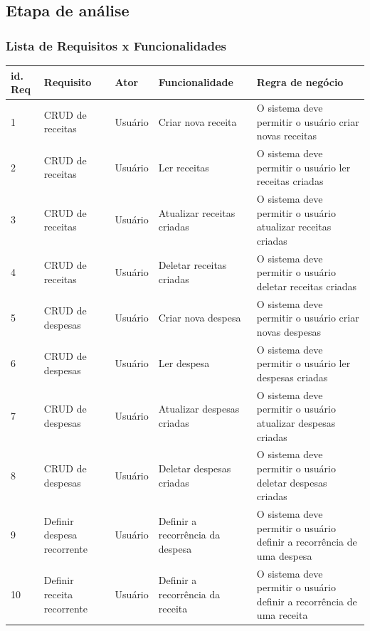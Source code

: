 \subsection{Etapa de análise}

\subsubsection{Lista de Requisitos x Funcionalidades}

\begin{longtable}[h!]{ | M{1cm} | T{2cm} | T{1.5cm} | T{4cm} | T{4cm} | } \hline

    \textbf{id. Req} & \textbf{Requisito} & \textbf{Ator} & \textbf{Funcionalidade} & \textbf{Regra de negócio} \\ [5pt] \hline
    
    1 & CRUD de receitas & Usuário & Criar nova receita & O sistema deve permitir o usuário criar novas receitas \\  \hline

    2 & CRUD de receitas & Usuário & Ler receitas & O sistema deve permitir o usuário ler receitas criadas \\  \hline

    3 & CRUD de receitas & Usuário & Atualizar receitas criadas & O sistema deve permitir o usuário atualizar receitas criadas \\  \hline

    4 & CRUD de receitas & Usuário & Deletar receitas criadas & O sistema deve permitir o usuário deletar receitas criadas \\  \hline

    5 & CRUD de despesas & Usuário & Criar nova despesa & O sistema deve permitir o usuário criar novas despesas \\  \hline

    6 & CRUD de despesas & Usuário & Ler despesa & O sistema deve permitir o usuário ler despesas criadas \\  \hline

    7 & CRUD de despesas & Usuário & Atualizar despesas criadas & O sistema deve permitir o usuário atualizar despesas criadas \\  \hline

    8 & CRUD de despesas & Usuário & Deletar despesas criadas & O sistema deve permitir o usuário deletar despesas criadas \\  \hline
    
    9 & Definir despesa recorrente & Usuário & Definir a recorrência da despesa & O sistema deve permitir o usuário definir a recorrência de uma despesa \\  \hline

    10 & Definir receita recorrente & Usuário & Definir a recorrência da receita & O sistema deve permitir o usuário definir a recorrência de uma receita \\  \hline

\end{longtable}


